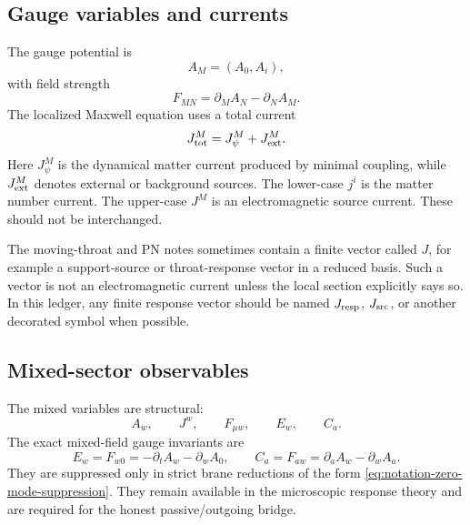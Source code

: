 \subsection{Gauge variables and currents}
\label{subsec:notation-gauge}

The gauge potential is
\begin{equation}
  A_M=(A_0,A_i),
\end{equation}
with field strength
\begin{equation}
  F_{MN}=\partial_MA_N-\partial_NA_M.
\end{equation}
The localized Maxwell equation uses a total current
\begin{equation}
  J_{\rm tot}^M=J_\psi^M+J_{\rm ext}^M.
\end{equation}
Here \(J_\psi^M\) is the dynamical matter current produced by minimal coupling, while \(J_{\rm ext}^M\) denotes external or background sources.  The lower-case \(j^i\) is the matter number current.  The upper-case \(J^M\) is an electromagnetic source current.  These should not be interchanged.

The moving-throat and PN notes sometimes contain a finite vector called \(J\), for example a support-source or throat-response vector in a reduced basis.  Such a vector is not an electromagnetic current unless the local section explicitly says so.  In this ledger, any finite response vector should be named \(J_{\rm resp}\), \(J_{\rm src}\), or another decorated symbol when possible.

\subsection{Mixed-sector observables}
\label{subsec:notation-mixed-sector}

The mixed variables are structural:
\begin{equation}
  A_w,
  \qquad
  J^w,
  \qquad
  F_{\mu w},
  \qquad
  E_w,
  \qquad
  C_a.
\end{equation}
The exact mixed-field gauge invariants are
\begin{equation}
  E_w=F_{w0}=-\partial_t A_w-\partial_wA_0,
  \qquad
  C_a=F_{aw}=\partial_aA_w-\partial_wA_a.
  \label{eq:notation-mixed-invariants}
\end{equation}
They are suppressed only in strict brane reductions of the form \eqref{eq:notation-zero-mode-suppression}.  They remain available in the microscopic response theory and are required for the honest passive/outgoing bridge.

